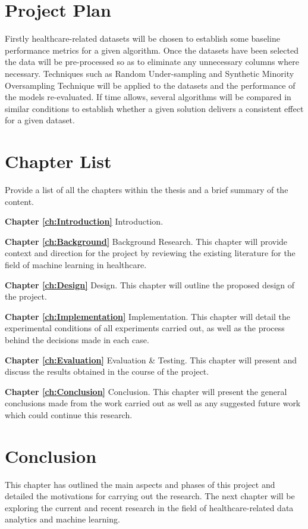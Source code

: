 \section{Project Plan}
Firstly healthcare-related datasets will be chosen to establish some baseline performance metrics for a given algorithm. Once the datasets have been selected the data will be pre-processed so as to eliminate any unnecessary columns where necessary.\newline
Techniques such as Random Under-sampling and Synthetic Minority Oversampling Technique will be applied to the datasets and the performance of the models re-evaluated.\newline
If time allows, several algorithms will be compared in similar conditions to establish whether a given solution delivers a consistent effect for a given dataset.\newline

\section{Chapter List}
Provide a list of all the chapters within the thesis and a brief summary of the content.

\textbf{Chapter \ref{ch:Introduction}} Introduction. 

\textbf{Chapter \ref{ch:Background}} Background Research.
This chapter will provide context and direction for the project by reviewing the existing literature for the field of machine learning in healthcare.\newline


\textbf{Chapter \ref{ch:Design}} Design.
This chapter will outline the proposed design of the project.\newline


\textbf{Chapter \ref{ch:Implementation}} Implementation.
This chapter will detail the experimental conditions of all experiments carried out, as well as the process behind the decisions made in each case.\newline

\textbf{Chapter \ref{ch:Evaluation}} Evaluation \& Testing.
This chapter will present and discuss the results obtained in the course of the project.\newline

\textbf{Chapter \ref{ch:Conclusion}} Conclusion. 
This chapter will present the general conclusions made from the work carried out as well as any suggested future work which could continue this research.

\section{Conclusion}
This chapter has outlined the main aspects and phases of this project and detailed the motivations for carrying out the research. 
The next chapter will be exploring the current and recent research in the field of healthcare-related data analytics and machine learning.
